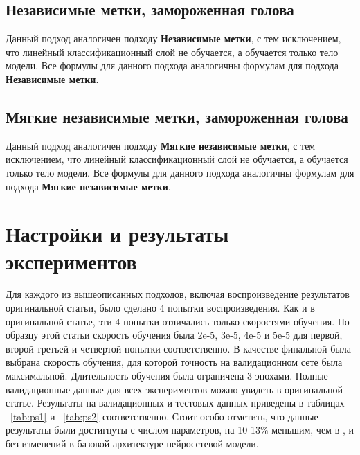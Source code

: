 \subsection{Независимые метки, замороженная голова}\label{subch:pseudolabel/sect3/sub7}

Данный подход аналогичен подходу \textbf{Независимые метки}, с тем исключением, что линейный классификационный слой не обучается, а обучается только тело модели. Все формулы для данного подхода аналогичны формулам для подхода \textbf{Независимые метки}.

\subsection{Мягкие независимые метки, замороженная голова}\label{subch:pseudolabel/sect3/sub8}

Данный подход аналогичен подходу \textbf{Мягкие независимые метки}, с тем исключением, что линейный классификационный слой не обучается, а обучается только тело модели. Все формулы для данного подхода аналогичны формулам для подхода \textbf{Мягкие независимые метки}.
\section{Настройки и результаты экспериментов}\label{ch:pseudolabel/sect4}

Для каждого из вышеописанных подходов, включая воспроизведение результатов оригинальной статьи, было сделано 4 попытки воспроизведения. Как и в оригинальной статье, эти 4 попытки отличались только скоростями обучения. По образцу этой статьи скорость обучения была 2e-5, 3e-5, 4e-5 и 5e-5 для первой, второй третьей и четвертой попытки соответственно. В качестве финальной была выбрана скорость обучения, для которой точность на валидационном сете была максимальной. Длительность обучения была ограничена 3 эпохами. Полные валидационные данные для всех экспериментов можно увидеть в оригинальной статье.
Результаты на валидационных и тестовых данных приведены в таблицах ~\ref{tab:ps1} и ~\ref{tab:ps2} соответственно. Стоит особо отметить, что данные результаты были достигнуты с числом параметров, на 10-13\% меньшим, чем в \cite{stickland_2019}, и без изменений в базовой архитектуре нейросетевой модели.


